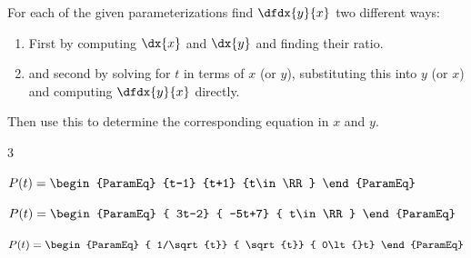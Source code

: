 
\pagebreak[4]

\begin{embeddedproblem}
  For each of the given parameterizations find $\dfdx{y}{x}$ two
  different ways:
  \begin{enumerate}[label={\bf{}(\roman*)}]{}
  \item First by computing $\dx{x}$ and $\dx{y}$ and finding
    their ratio. 
  \item and second by solving for $t$ in terms of $x$ (or $y$),
    substituting this into $y$ (or $x$) and computing $\dfdx{y}{x}$
    directly.
  \end{enumerate}

  Then use this to determine the corresponding equation in $x$ and
  $y$.
  \begin{enumerate}[label={\bf{}(\alph*)}]
    \begin{multicols}{3}
    \item $P(t)=
      \begin{ParamEq}
        {t-1}
        {t+1}
        {t\in\RR}
      \end{ParamEq}
      $
    \item $P(t)=
      \begin{ParamEq}
{        3t-2}
{        -5t+7}
{        t\in\RR}
      \end{ParamEq}
      $
    \item $ P(t)=
      \begin{ParamEq}
{        1/\sqrt{t}}
{        \sqrt{t}}
{        0\lt{}t}
      \end{ParamEq}
      $
    \end{multicols}
  \end{enumerate}
\vskip-10mm{}
\end{embeddedproblem}




